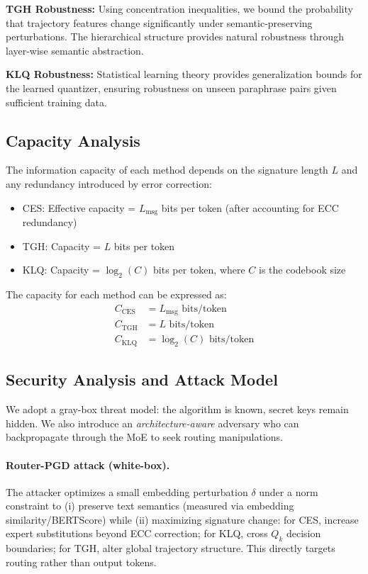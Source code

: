 \textbf{TGH Robustness:} Using concentration inequalities, we bound the probability that trajectory features change significantly under semantic-preserving perturbations. The hierarchical structure provides natural robustness through layer-wise semantic abstraction.

\textbf{KLQ Robustness:} Statistical learning theory provides generalization bounds for the learned quantizer, ensuring robustness on unseen paraphrase pairs given sufficient training data.

\subsection{Capacity Analysis}

The information capacity of each method depends on the signature length $L$ and any redundancy introduced by error correction:

\begin{itemize}
\item CES: Effective capacity = $L_{\text{msg}}$ bits per token (after accounting for ECC redundancy)
\item TGH: Capacity = $L$ bits per token  
\item KLQ: Capacity = $\log_2(C)$ bits per token, where $C$ is the codebook size
\end{itemize}

The capacity for each method can be expressed as:
\begin{align}
C_{\text{CES}} &= L_{\text{msg}} \text{ bits/token} \label{eq:ces_capacity} \\
C_{\text{TGH}} &= L \text{ bits/token} \label{eq:tgh_capacity} \\
C_{\text{KLQ}} &= \log_2(C) \text{ bits/token} \label{eq:klq_capacity}
\end{align}

\subsection{Security Analysis and Attack Model}

We adopt a gray-box threat model: the algorithm is known, secret keys remain hidden. We also introduce an \emph{architecture-aware} adversary who can backpropagate through the MoE to seek routing manipulations.

\paragraph{Router-PGD attack (white-box).} The attacker optimizes a small embedding perturbation $\delta$ under a norm constraint to (i) preserve text semantics (measured via embedding similarity/BERTScore) while (ii) maximizing signature change: for CES, increase expert substitutions beyond ECC correction; for KLQ, cross $Q_k$ decision boundaries; for TGH, alter global trajectory structure. This directly targets routing rather than output tokens.

